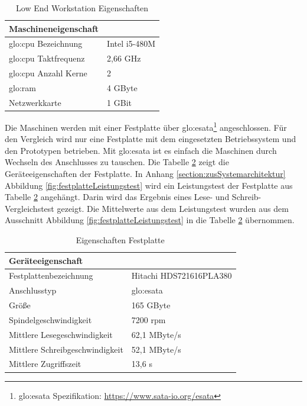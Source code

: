 \begin{table}[ht]
	\centering
		\begin{tabular}{@{}ll@{}} \toprule
			\textbf{Maschineneigenschaft} &  \\ \midrule
			\gls{glo:cpu} Bezeichnung & Intel i5-480M \\
			\gls{glo:cpu} Taktfrequenz & 2,66 GHz \\
			\gls{glo:cpu} Anzahl Kerne & 2 \\
			\gls{glo:ram} & 4 GByte \\
			Netzwerkkarte & 1 GBit \\
			\bottomrule			
		\end{tabular}
	\caption{Low End Workstation Eigenschaften}
	\label{tab:loendwork}
\end{table}

Die Maschinen werden mit einer Festplatte über \gls{glo:esata}\footnote{\gls{glo:esata} Spezifikation: \url{https://www.sata-io.org/esata}} angeschlossen. Für den Vergleich wird nur eine Festplatte mit dem eingesetzten Betriebssystem und den Prototypen betrieben. Mit \gls{glo:esata} ist es einfach die Maschinen durch Wechseln des Anschlusses zu tauschen. Die Tabelle \ref{tab:festplatte} zeigt die Geräteeigenschaften der Festplatte. In Anhang \ref{section:zusSystemarchitektur} Abbildung \ref{fig:festplatteLeistungstest} wird ein Leistungstest der Festplatte aus Tabelle \ref{tab:festplatte} angehängt. Darin wird das Ergebnis eines Lese- und Schreib-Vergleichstest gezeigt. Die Mittelwerte aus dem Leistungstest wurden aus dem Ausschnitt Abbildung \ref{fig:festplatteLeistungstest} in die Tabelle \ref{tab:festplatte} übernommen.

\begin{table}[ht]
	\centering
		\begin{tabular}{@{}ll@{}} \toprule
			\textbf{Geräteeigenschaft} &  \\ \midrule
			Festplattenbezeichnung & Hitachi HDS721616PLA380 \\
			Anschlusstyp & \gls{glo:esata} \\
			Größe & 165 GByte \\
			Spindelgeschwindigkeit & 7200 rpm \\
			Mittlere Lesegeschwindigkeit & 62,1 MByte/s \\
			Mittlere Schreibgeschwindigkeit & 52,1 MByte/s \\
			Mittlere Zugriffszeit & 13,6 s \\
			\bottomrule			
		\end{tabular}
	\caption{Eigenschaften Festplatte}
	\label{tab:festplatte}
\end{table}

